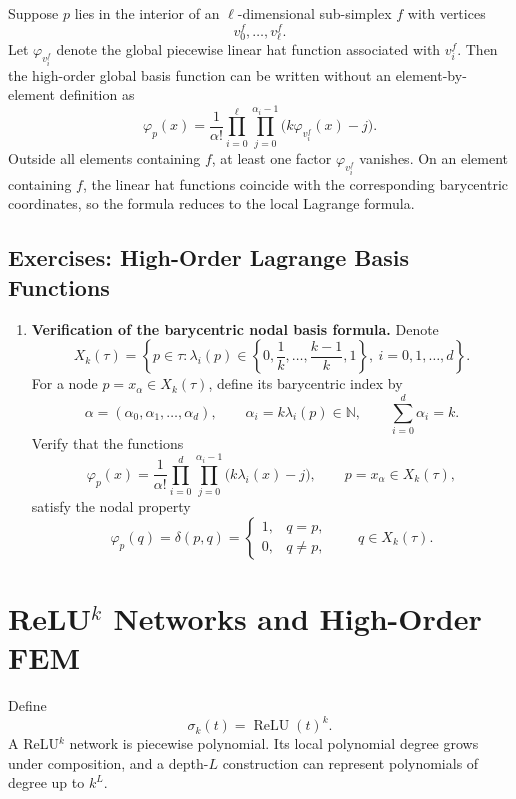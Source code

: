 \documentclass[11pt,a4paper]{article}
\newcommand{\ReLU}{\operatorname{ReLU}}
\theoremstyle{definition}
\theoremstyle{plain}
\theoremstyle{remark}
\theoremstyle{plain}
\begin{document}
Suppose $p$ lies in the interior of an $\ell$-dimensional sub-simplex $f$ with vertices
\[
  v_0^f,\ldots,v_\ell^f.
\]
Let $\varphi_{v_i^f}$ denote the global piecewise linear hat function associated with $v_i^f$. Then the high-order global basis function can be written without an element-by-element definition as
\[
  \varphi_p(x)
  =\frac1{\alpha!}
  \prod_{i=0}^\ell\prod_{j=0}^{\alpha_i-1}
  \bigl(k\varphi_{v_i^f}(x)-j\bigr).
\]
Outside all elements containing $f$, at least one factor $\varphi_{v_i^f}$ vanishes. On an element containing $f$, the linear hat functions coincide with the corresponding barycentric coordinates, so the formula reduces to the local Lagrange formula.



\subsection*{Exercises: High-Order Lagrange Basis Functions}
\begin{enumerate}[label=\textbf{Exercise \arabic*.},leftmargin=2.6em]
  \item \textbf{Verification of the barycentric nodal basis formula.}
  Denote
  \[
    X_k(\tau)=\left\{p\in\tau:
    \lambda_i(p)\in\left\{0,\frac1k,\ldots,\frac{k-1}{k},1\right\},
    \ i=0,1,\ldots,d\right\}.
  \]
  For a node $p=x_\alpha\in X_k(\tau)$, define its barycentric index by
  \[
    \alpha=(\alpha_0,\alpha_1,\ldots,\alpha_d),
    \qquad
    \alpha_i=k\lambda_i(p)\in\mathbb N,
    \qquad
    \sum_{i=0}^d\alpha_i=k.
  \]
  Verify that the functions
  \[
    \varphi_p(x)
    =\frac1{\alpha!}
    \prod_{i=0}^d\prod_{j=0}^{\alpha_i-1}
    \bigl(k\lambda_i(x)-j\bigr),
    \qquad p=x_\alpha\in X_k(\tau),
  \]
  satisfy the nodal property
  \[
    \varphi_p(q)=\delta(p,q)=
    \begin{cases}
      1, & q=p,\\
      0, & q\ne p,
    \end{cases}
    \qquad q\in X_k(\tau).
  \]
\end{enumerate}

\section{ReLU$^k$ Networks and High-Order FEM}

Define
\[
  \sigma_k(t)=\ReLU(t)^k.
\]
A ReLU$^k$ network is piecewise polynomial. Its local polynomial degree grows under composition, and a depth-$L$ construction can represent polynomials of degree up to $k^L$.
\end{document}

